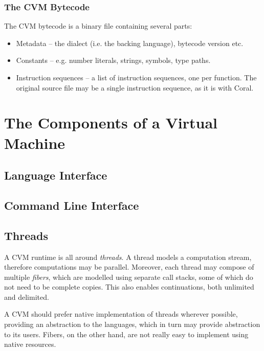 \subsection{The CVM Bytecode}

The CVM bytecode is a binary file containing several parts:

\begin{itemize}
\item Metadata -- the dialect (i.e. the backing language), bytecode version etc.
\item Constants -- e.g. number literals, strings, symbols, type paths. 
\item Instruction sequences -- a list of instruction sequences, one per function. The original source file may be a single instruction sequence, as it is with Coral. 
\end{itemize}







\chapter{The Components of a Virtual Machine}

\section{Language Interface}

\section{Command Line Interface}

\section{Threads}

A CVM runtime is all around {\em threads}. A thread models a computation stream, therefore computations may be parallel. Moreover, each thread may compose of multiple {\em fibers}, which are modelled using separate call stacks, some of which do not need to be complete copies. This also enables continuations, both unlimited and delimited. 

A CVM should prefer native implementation of threads wherever possible, providing an abstraction to the languages, which in turn may provide abstraction to its users. Fibers, on the other hand, are not really easy to implement using native resources. 


